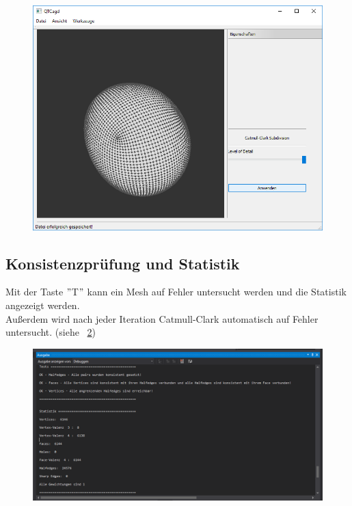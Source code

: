 \begin{figure}[ht!]
	\centering
	\includegraphics[width=0.6\linewidth]{content/pictures/8-MeshCatmullClark}
	\label{fig:MeshCatmullClark}
	\caption{}
\end{figure}

\subsection{Konsistenzprüfung und Statistik}
Mit der Taste $"$T$"$ kann ein Mesh auf Fehler untersucht werden und die Statistik angezeigt werden.\\
Außerdem wird nach jeder Iteration Catmull-Clark automatisch auf Fehler untersucht. (siehe ~\ref{fig:TestStatistik})

\begin{figure}[ht!]
	\centering
	\includegraphics[width=0.6\linewidth]{content/pictures/9-TestStatistik}
	\label{fig:TestStatistik}
	\caption{}
\end{figure}
